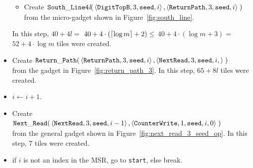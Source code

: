 \begin{itemize}
\begin{itemize}
        \item Create
        $\begin{aligned}[t]
            {\tt South\_Line4\textit{l}}(&\left\langle {\tt DigitTopB},  3, {\tt seed}, i \right\rangle,
                                          \left\langle {\tt ReturnPath}, 3, {\tt seed}, i \right\rangle \;)
        \end{aligned}$\\from the micro-gadget shown in Figure~\ref{fig:south_line}.
    \end{itemize}
    In this step, $40 + 4l =$
    $40 + 4 \cdot \left( \ceil*{\log m} + 2 \right) \leq$
    $40 + 4 \cdot \left( {\log m} + 3 \right) =$
    $52 + 4 \cdot {\log m}$ tiles were created.

    \item Create
    $\begin{aligned}[t]
        \returnpath(&\left\langle {\tt ReturnPath}, 3, {\tt seed}, i  \right\rangle,
                     \left\langle {\tt NextRead},   3, {\tt seed}, i, \right\rangle \;)
    \end{aligned}$\\from the gadget in Figure~\ref{fig:return_path_3}.
    In this step, $65 + 8l$ tiles were created.

    \item $i \gets i + 1$.

    \item Create
    $\begin{aligned}[t]
        \nextread(&\left\langle {\tt NextRead},     3, {\tt seed}, i - 1 \right\rangle,
                   \left\langle {\tt CounterWrite}, 1, {\tt seed}, i, 0  \right\rangle \;)
    \end{aligned}$\\ from the general gadget shown in Figure~\ref{fig:next_read_3_seed_op}.
    In this step, $7$ tiles were created.

    \item if $i$ is not an index in the MSR, go to {\tt start}, else break.
\end{itemize}

